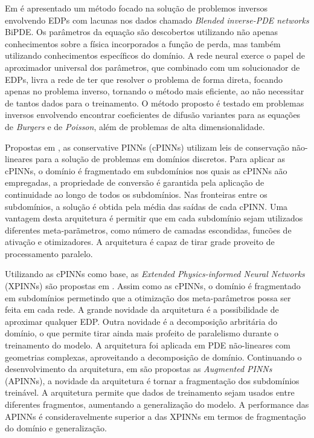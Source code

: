 Em \cite{pakravan-et:2021-bipde} é apresentado um método focado na solução de 
problemos inversos envolvendo EDPs com lacunas nos dados chamado 
\textit{Blended inverse-PDE networks} BiPDE.
Os parâmetros da equação são descobertos utilizando não apenas conhecimentos sobre
a física incorporados a função de perda, mas também utilizando conhecimentos específicos 
do domínio. 
A rede neural exerce o papel de aproximador universal dos parâmetros, que combinado 
com um solucionador de EDPs, livra a rede de ter que resolver o problema de 
forma direta, focando apenas no problema inverso, tornando o método mais eficiente,
ao não necessitar de tantos dados para o treinamento.
O método proposto é testado em problemas inversos envolvendo encontrar coeficientes
de difusão variantes para as equações de \textit{Burgers} e de \textit{Poisson}, 
além de problemas de alta dimensionalidade.

Propostas em \cite{jagtap-etal:2020-convervative-pinns}, as conservative PINNs 
(cPINNs) utilizam leis de conservação não-lineares para a solução de problemas 
em domínios discretos. Para aplicar as cPINNs, o domínio é fragmentado em subdomínios
nos quais as cPINNs aão empregadas, a propriedade de conversão é garantida pela 
aplicação de continuidade ao longo de todos os subdomínios. Nas fronteiras entre
os subdomínios, a solução é obtida pela média das saídas de cada cPINN.
Uma vantagem desta arquitetura é permitir que em cada subdomínio sejam utilizados
diferentes meta-parãmetros, como número de camadas escondidas, funcões de ativação
e otimizadores.
A arquitetura é capaz de tirar grade proveito de processamento paralelo.  

Utilizando as cPINNs como base, as \textit{Extended Physics-informed Neural Networks}
(XPINNs) são propostas em \cite{jagtap-etal:2020-extended-pinns}. Assim como as 
cPINNs, o domínio é fragmentado em subdomínios permetindo que a otimização dos
meta-parâmetros possa ser feita em cada rede. 
A grande novidade da arquitetura é a possibilidade de aproximar qualquer EDP.
Outra novidade é a decomposição arbritária do domínio, o que permite tirar ainda
mais profeito de paralelismo durante o treinamento do modelo.
A arquitetura foi aplicada em PDE não-lineares com geometrias complexas, 
aproveitando a decomposição de domínio.
Continuando o desenvolvimento da arquitetura, em \cite{hu-etal:2023-augmented-pinns}
são propostas as \textit{Augmented PINNs} (APINNs), a novidade da arquitetura 
é tornar a fragmentação dos subdomínios treinável.
A arquitetura permite que dados de treinamento sejam usados entre diferentes 
fragmentos, aumentando a generalização do modelo.
A performance das APINNs é consideravelmente superior a das XPINNs em termos 
de fragmentação do domínio e generalização.

